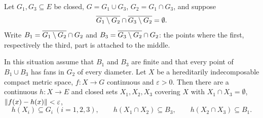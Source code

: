 Let $G_1,G_3\subseteq E$ be closed, $G=G_1\cup G_3$, $G_2=G_1\cap G_3$, and suppose
\begin{equation}\label{eq:F3}
\overline{G_1\setminus G_2}\cap\overline{G_3\setminus G_2}=\emptyset .
\end{equation}
Write $B_1=\overline{G_1\setminus G_2}\cap G_2$ and $B_3=\overline{G_3\setminus G_2}\cap G_2$: the points where the first, respectively the third, part is attached to the middle.

\begin{theorem}\label{thm:ho8-core}
In this situation assume that $B_1$ and $B_3$ are finite and that every point of $B_1\cup B_3$ has fans in $G_2$ of every diameter. Let $X$ be a hereditarily
indecomposable compact metric space, $f\colon X\to G$ continuous and $\varepsilon>0$. Then there are a continuous $h\colon X\to E$ and closed sets
$X_1,X_2,X_3$ covering $X$ with $X_1\cap X_3=\emptyset$, $\lVert f(x)-h(x)\rVert<\varepsilon$,
\[
h(X_i)\subseteq G_i\ (i=1,2,3),\qquad h(X_1\cap X_2)\subseteq B_3,\qquad h(X_2\cap X_3)\subseteq B_1 .
\]
\end{theorem}

